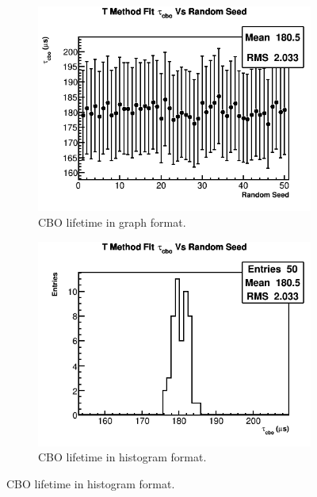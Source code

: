 	\begin{figure}[]
	\centering
	    \begin{subfigure}[t]{0.45\textwidth}
		    \centering
			\includegraphics[width=\textwidth]{TMethod_tau_cbo_Vs_Iter_Canv}
		    \caption{CBO lifetime in graph format.}
	    \end{subfigure}
	    \hspace{4mm}
	    \begin{subfigure}[t]{0.45\textwidth}
		    \centering
			\includegraphics[width=\textwidth]{TMethod_tau_cbo_Vs_Iter_Canv_hist}
		    \caption{CBO lifetime in histogram format.}
	    \end{subfigure}%

\end{figure}
